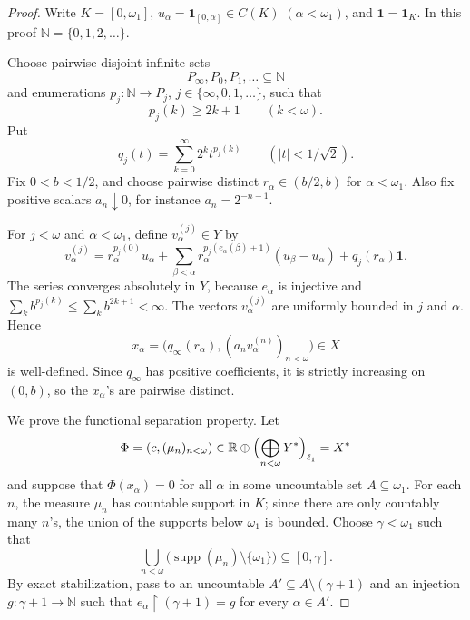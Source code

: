 \documentclass[11pt]{article}
\newcommand{\N}{\mathbb N}
\newcommand{\R}{\mathbb R}
\newcommand{\one}{\mathbf 1}
\newcommand{\supp}{\operatorname{supp}}
\begin{document}
\begin{proof}
Write \(K=[0,\omega_1]\), \(u_\alpha=\one_{[0,\alpha]}\in C(K)\)
\((\alpha<\omega_1)\), and \(\one=\one_K\).  In this proof
\(\N=\{0,1,2,\ldots\}\).

Choose pairwise disjoint infinite sets
\[
   P_\infty,P_0,P_1,\ldots\subseteq\N
\]
and enumerations \(p_j:\N\to P_j\), \(j\in\{\infty,0,1,\ldots\}\), such that
\[
   p_j(k)\geq 2k+1\qquad(k<\omega).
\]
Put
\[
   q_j(t)=\sum_{k=0}^{\infty}2^k t^{p_j(k)}
   \qquad (|t|<1/\sqrt2).
\]
Fix \(0<b<1/2\), and choose pairwise distinct \(r_\alpha\in(b/2,b)\) for
\(\alpha<\omega_1\).  Also fix positive scalars \(a_n\downarrow0\), for
instance \(a_n=2^{-n-1}\).

For \(j<\omega\) and \(\alpha<\omega_1\), define \(v_\alpha^{(j)}\in Y\) by
\[
 v_\alpha^{(j)}
   = r_\alpha^{p_j(0)}u_\alpha
     +\sum_{\beta<\alpha}
        r_\alpha^{p_j(e_\alpha(\beta)+1)}(u_\beta-u_\alpha)
     +q_j(r_\alpha)\one .
\]
The series converges absolutely in \(Y\), because \(e_\alpha\) is injective and
\(\sum_k b^{p_j(k)}\leq\sum_k b^{2k+1}<\infty\).  The vectors
\(v_\alpha^{(j)}\) are uniformly bounded in \(j\) and \(\alpha\).  Hence
\[
   x_\alpha
      =\bigl(q_\infty(r_\alpha), (a_n v_\alpha^{(n)})_{n<\omega}\bigr)
      \in X
\]
is well-defined.  Since \(q_\infty\) has positive coefficients, it is strictly
increasing on \((0,b)\), so the \(x_\alpha\)'s are pairwise distinct.

We prove the functional separation property.  Let
\[
   \Phi=(c,(\mu_n)_{n<\omega})\in
      \R\oplus\Bigl(\bigoplus_{n<\omega}Y^*\Bigr)_{\ell_1}=X^*
\]
and suppose that \(\Phi(x_\alpha)=0\) for all \(\alpha\) in some uncountable
set \(A\subseteq\omega_1\).  For each \(n\), the measure \(\mu_n\) has
countable support in \(K\); since there are only countably many \(n\)'s, the
union of the supports below \(\omega_1\) is bounded.  Choose
\(\gamma<\omega_1\) such that
\[
   \bigcup_{n<\omega}\bigl(\supp(\mu_n)\setminus\{\omega_1\}\bigr)
       \subseteq [0,\gamma].
\]
By exact stabilization, pass to an uncountable
\(A'\subseteq A\setminus(\gamma+1)\) and an injection \(g:\gamma+1\to\N\) such
that \(e_\alpha\!\upharpoonright(\gamma+1)=g\) for every \(\alpha\in A'\).


\end{proof}
\end{document}
